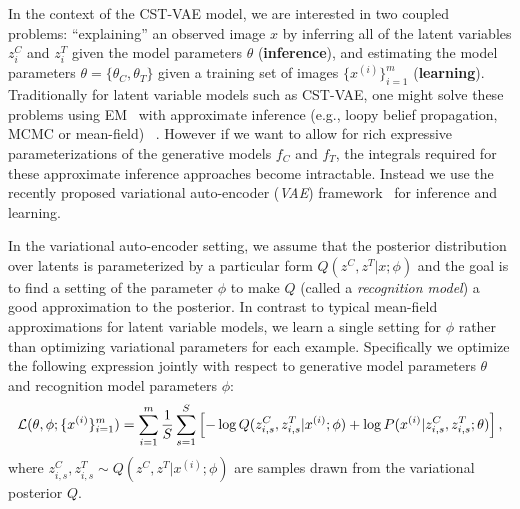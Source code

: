 In the context of the CST-VAE model, we are  interested in two coupled problems:
``explaining'' an observed image $x$ by inferring all of the latent variables $z^C_i$ and $z^T_i$ given the model parameters $\theta$  (\textbf{inference}), and 
 estimating the model parameters $\theta=\{\theta_C,\theta_T\}$ given a training set of images $\{x^{(i)}\}_{i=1}^m$ (\textbf{learning}).  
Traditionally for  latent variable models such as CST-VAE,  one might solve these problems using EM~\citep{dempster1977maximum}
with approximate inference (e.g., loopy belief propagation, MCMC or mean-field) ~\citep{wainwright2008graphical}. 
However if we want to allow for rich expressive parameterizations of the generative models $f_C$ and $f_T$, the integrals required
for these approximate inference approaches become intractable.  Instead we use the recently proposed 
variational auto-encoder (\emph{VAE}) framework~\citep{Kingma2014} for inference and learning.

In the variational auto-encoder setting, we assume that the posterior distribution over latents is parameterized by a particular form
 $Q(z^C, z^T|x;\phi)$ and the goal is to find a setting of
the parameter $\phi$ to make $Q$ (called a \emph{recognition model}) a good approximation to the posterior.  
In contrast to typical mean-field approximations for latent variable models,
we learn a single setting for $\phi$ rather than optimizing variational parameters for each example. 
Specifically we optimize the following expression
jointly with respect to generative model parameters $\theta$ and recognition model parameters $\phi$:
\begin{equation}\label{eqn:vae_objective}\footnotesize
\mathcal{L}(\theta, \phi; \{x^{(i)}\}_{i=1}^m)
	= \sum_{i=1}^m \frac{1}{S}\sum_{s=1}^S \left[-\log Q(z_{i,s}^C, z_{i,s}^T | x^{(i)};\phi) + \log P(x^{(i)} | z_{i,s}^C, z_{i,s}^T; \theta) \right],
\end{equation}
where $z_{i,s}^C, z_{i,s}^T \sim Q(z^C, z^T | x^{(i)};\phi) $ are samples drawn from the variational posterior $Q$.

